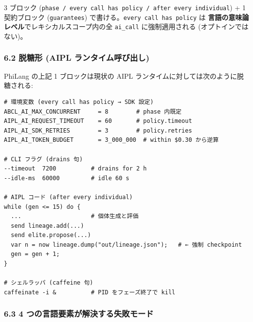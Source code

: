 \documentclass[
]{ltjsarticle}
\begin{document}
3 ブロック
(\texttt{phase\ /\ every\ call\ has\ policy\ /\ after\ every\ individual})
+ 1 契約ブロック (\texttt{guarantees})
で書ける。\texttt{every\ call\ has\ policy} は
\textbf{言語の意味論レベル}でレキシカルスコープ内の全 \texttt{ai\_call}
に強制適用される (オプトインではない)。

\subsubsection{6.2 脱糖形 (AIPL
ランタイム呼び出し)}\label{ux8131ux7cd6ux5f62-aipl-ux30e9ux30f3ux30bfux30a4ux30e0ux547cux3073ux51faux3057}

PhiLang の上記 1 ブロックは現状の AIPL
ランタイムに対しては次のように脱糖される:

\begin{verbatim}
# 環境変数 (every call has policy → SDK 設定)
ABCL_AI_MAX_CONCURRENT     = 8        # phase 内既定
AIPL_AI_REQUEST_TIMEOUT    = 60       # policy.timeout
AIPL_AI_SDK_RETRIES        = 3        # policy.retries
AIPL_AI_TOKEN_BUDGET       = 3_000_000  # within $0.30 から逆算

# CLI フラグ (drains 句)
--timeout  7200          # drains for 2 h
--idle-ms  60000         # idle 60 s

# AIPL コード (after every individual)
while (gen <= 15) do {
  ...                    # 個体生成と評価
  send lineage.add(...)
  send elite.propose(...)
  var n = now lineage.dump("out/lineage.json");   # ← 強制 checkpoint
  gen = gen + 1;
}

# シェルラッパ (caffeine 句)
caffeinate -i &          # PID をフェーズ終了で kill
\end{verbatim}

\subsubsection{6.3 4
つの言語要素が解決する失敗モード}\label{ux3064ux306eux8a00ux8a9eux8981ux7d20ux304cux89e3ux6c7aux3059ux308bux5931ux6557ux30e2ux30fcux30c9}
\end{document}
